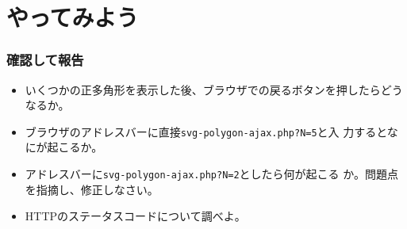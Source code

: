 \section{やってみよう}
\begin{frame}[containsverbatim]
 \frametitle{確認して報告}
 \begin{itemize}
  \item  いくつかの正多角形を表示した後、ブラウザでの戻るボタンを押したらどう
 なるか。
  \item ブラウザのアドレスバーに直接\verb+svg-polygon-ajax.php?N=5+と入
        力するとなにが起こるか。
	\item アドレスバーに\Verb+svg-polygon-ajax.php?N=2+としたら何が起こる
				か。問題点を指摘し、修正しなさい。
	\item HTTPのステータスコードについて調べよ。
 \end{itemize}
\end{frame}

\begin{frame}[containsverbatim]
\frametitle{}
\end{frame}

